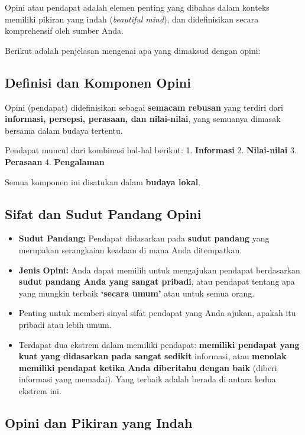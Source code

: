 \documentclass[
  letterpaper,
  DIV=11,
  numbers=noendperiod]{scrreprt}
\providecommand{\tightlist}{%
  \setlength{\itemsep}{0pt}\setlength{\parskip}{0pt}}
\begin{document}
Opini atau pendapat adalah elemen penting yang dibahas dalam konteks
memiliki pikiran yang indah (\emph{beautiful mind}), dan didefinisikan
secara komprehensif oleh sumber Anda.

Berikut adalah penjelasan mengenai apa yang dimaksud dengan opini:

\subsection{Definisi dan Komponen
Opini}\label{definisi-dan-komponen-opini}

Opini (pendapat) didefinisikan sebagai \textbf{semacam rebusan} yang
terdiri dari \textbf{informasi, persepsi, perasaan, dan nilai-nilai},
yang semuanya dimasak bersama dalam budaya tertentu.

Pendapat muncul dari kombinasi hal-hal berikut: 1. \textbf{Informasi} 2.
\textbf{Nilai-nilai} 3. \textbf{Perasaan} 4. \textbf{Pengalaman}

Semua komponen ini disatukan dalam \textbf{budaya lokal}.

\subsection{Sifat dan Sudut Pandang
Opini}\label{sifat-dan-sudut-pandang-opini}

\begin{itemize}
\tightlist
\item
  \textbf{Sudut Pandang:} Pendapat didasarkan pada \textbf{sudut
  pandang} yang merupakan serangkaian keadaan di mana Anda ditempatkan.
\item
  \textbf{Jenis Opini:} Anda dapat memilih untuk mengajukan pendapat
  berdasarkan \textbf{sudut pandang Anda yang sangat pribadi}, atau
  pendapat tentang apa yang mungkin terbaik \textbf{`secara umum'} atau
  untuk semua orang.
\item
  Penting untuk memberi sinyal sifat pendapat yang Anda ajukan, apakah
  itu pribadi atau lebih umum.
\item
  Terdapat dua ekstrem dalam memiliki pendapat: \textbf{memiliki
  pendapat yang kuat yang didasarkan pada sangat sedikit} informasi,
  atau \textbf{menolak memiliki pendapat ketika Anda diberitahu dengan
  baik} (diberi informasi yang memadai). Yang terbaik adalah berada di
  antara kedua ekstrem ini.
\end{itemize}

\subsection{Opini dan Pikiran yang
Indah}\label{opini-dan-pikiran-yang-indah}
\end{document}
